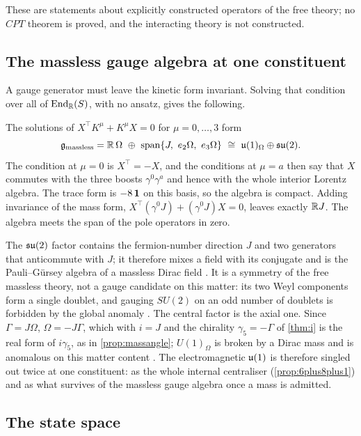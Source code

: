 These are statements about explicitly constructed operators of the free theory; no $CPT$ theorem is proved, and the interacting
theory is not constructed.

\subsection{The massless gauge algebra at one constituent}

A gauge generator must leave the kinetic form invariant. Solving that condition over all of $\operatorname{End}_{\mathbb{R}}(S)$, with no ansatz, gives the
following.

\begin{proposition}
\label{prop:gauge1}
The solutions of $X^{\!\top}K^\mu+K^\mu X=0$ for $\mu=0,\dots,3$ form
\[
\mathfrak g_{\rm massless}=\R\,\Omega\ \oplus\ \operatorname{span}\{J,\ e_2\Omega,\ e_3\Omega\}\ \cong\ \uu1_\Omega\oplus\su2 .
\]
The condition at $\mu=0$ is $X^{\!\top}=-X$, and the conditions at $\mu=a$ then say that $X$ commutes with the three boosts
$\gamma^0\gamma^a$ and hence with the whole interior Lorentz algebra. The trace form is $-8\,\mathbf 1$ on this basis, so the algebra is
compact. Adding invariance of the mass form, $X^{\!\top}(\gamma^0J)+(\gamma^0J)X=0$, leaves exactly $\mathbb{R} J$. The algebra meets the span of the
pole operators in zero.
\end{proposition}

The $\mathfrak{su}(2)$ factor contains the fermion-number direction $J$ and two generators that anticommute with $J$; it therefore mixes a field with
its conjugate and is the Pauli--G\"ursey algebra of a massless Dirac field \cite{Pauli57,Gursey58}. It is a symmetry of the free massless
theory, not a gauge candidate on this matter: its two Weyl components form a single doublet, and gauging $SU(2)$ on an odd number of
doublets is forbidden by the global anomaly \cite{Witten82}. The central factor is the axial one. Since $\Gamma=J\Omega$, $\Omega=-J\Gamma$,
which with $i=J$ and the chirality $\gamma_5=-\Gamma$ of \cref{thm:i} is the real form of $i\gamma_5$, as in \cref{prop:massangle}; $U(1)_\Omega$ is broken by a Dirac mass and is anomalous on this matter content \cite{Bilal,AlvarezGaumeWitten}.
The electromagnetic $\mathfrak{u}(1)$ is therefore singled out twice at one constituent: as the whole internal centraliser
(\cref{prop:6plus8plus1}) and as what survives of the massless gauge algebra once a mass is admitted.

\subsection{The state space}

